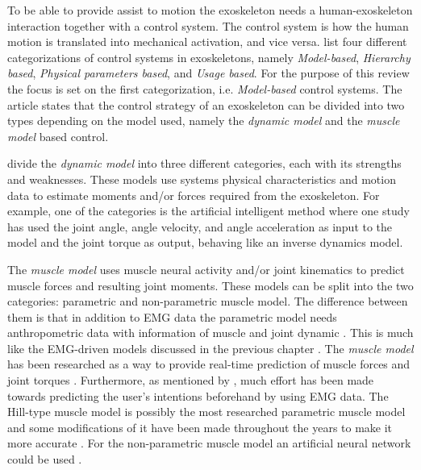 To be able to provide assist to motion the exoskeleton needs a human-exoskeleton interaction together with a control system. 
The control system is how the human motion is translated into mechanical activation, and vice versa. 
\textcite{Anam2012} list four different categorizations of control systems in exoskeletons, namely \textit{Model-based}, \textit{Hierarchy based}, \textit{Physical parameters based}, and \textit{Usage based}. 
For the purpose of this review the focus is set on the first categorization, i.e. \textit{Model-based} control systems.
The article states that the control strategy of an exoskeleton can be divided into two types depending on the model used, namely the \textit{dynamic model} and the \textit{muscle model} based control. 

\textcite{Anam2012} divide the \textit{dynamic model} into three different categories, each with its strengths and weaknesses.
These models use systems physical characteristics and motion data to estimate moments and/or forces required from the exoskeleton. 
For example, one of the categories is the artificial intelligent method where one study has used the joint angle, angle velocity, and angle acceleration as input to the model and the joint torque as output, behaving like an inverse dynamics model.

The \textit{muscle model} uses muscle neural activity and/or joint kinematics to predict muscle forces and resulting joint moments. These models can be split into the two categories: parametric and non-parametric muscle model. 
The difference between them is that in addition to \ac{EMG} data the parametric model needs anthropometric data with information of muscle and joint dynamic \cite{Anam2012}.
This is much like the \ac{EMG}-driven models discussed in the previous chapter \cite{Pizzolato2015}.
The \textit{muscle model} has been researched as a way to provide real-time prediction of muscle forces and joint torques \cite{Anam2012, durandau, Pizzolato2015}. 
Furthermore, as mentioned by \textcite{Anam2012}, much effort has been made towards predicting the user's intentions beforehand by using \ac{EMG} data.
The Hill-type muscle model is possibly the most researched parametric muscle model and some modifications of it have been made throughout the years to make it more accurate \cite{Lloyd2003, Anam2012, Pizzolato2015, Lee14-1}.
For the non-parametric muscle model an artificial neural network could be used \cite{Kiguchi2012,Lee14-1}.  

